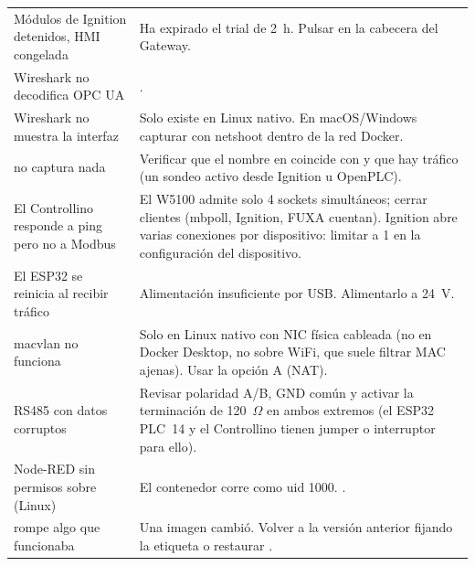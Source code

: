 \begin{longtable}{L{4.6cm} L{10.8cm}}
Módulos de Ignition detenidos, HMI congelada & Ha expirado el trial de 2~h. Pulsar  en la cabecera del Gateway. \\
Wireshark no decodifica OPC UA & . \\
Wireshark no muestra la interfaz  & Solo existe en Linux nativo. En macOS/Windows capturar con netshoot dentro de la red Docker. \\
 no captura nada & Verificar que el nombre en  coincide con  y que hay tráfico (un sondeo activo desde Ignition u OpenPLC). \\
El Controllino responde a ping pero no a Modbus & El W5100 admite solo 4 sockets simultáneos; cerrar clientes (mbpoll, Ignition, FUXA cuentan). Ignition abre varias conexiones por dispositivo: limitar a 1 en la configuración del dispositivo. \\
El ESP32 se reinicia al recibir tráfico & Alimentación insuficiente por USB. Alimentarlo a 24~V. \\
macvlan no funciona & Solo en Linux nativo con NIC física cableada (no en Docker Desktop, no sobre WiFi, que suele filtrar MAC ajenas). Usar la opción A (NAT). \\
RS485 con datos corruptos & Revisar polaridad A/B, GND común y activar la terminación de 120~$\Omega$ en ambos extremos (el ESP32 PLC~14 y el Controllino tienen jumper o interruptor para ello). \\
Node-RED sin permisos sobre  (Linux) & El contenedor corre como uid 1000. . \\
 rompe algo que funcionaba & Una imagen  cambió. Volver a la versión anterior fijando la etiqueta o restaurar . \\
\end{longtable}

